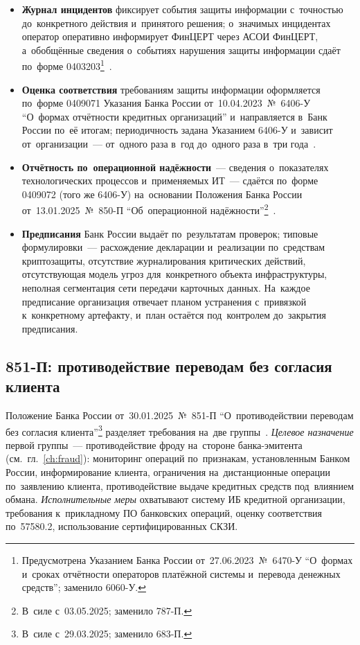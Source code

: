 \begin{itemize}
  \item\textbf{Журнал инцидентов} фиксирует события защиты
    информации с~точностью до~конкретного действия и~принятого
    решения; о~значимых инцидентах оператор оперативно информирует
    ФинЦЕРТ через АСОИ ФинЦЕРТ, а~обобщённые сведения о~событиях
    нарушения защиты информации сдаёт по~форме
    0403203\footnote{Предусмотрена Указанием Банка России от~27.06.2023~№~6470-У
      \enquote{О~формах и~сроках отчётности операторов платёжной системы
    и~перевода денежных средств}; заменило 6060-У.}~\cite{cbr-6470u}.
  \item\textbf{Оценка соответствия} требованиям защиты
    информации оформляется по~форме 0409071 Указания Банка России
    от~10.04.2023~№~6406-У \enquote{О~формах отчётности кредитных
    организаций} и~направляется в~Банк России по~её итогам;
    периодичность задана Указанием 6406-У и~зависит
    от~организации~--- от~одного раза в~год до~одного раза в~три
    года~\cite{cbr-6406u}.
  \item\textbf{Отчётность по~операционной надёжности}~--- сведения
    о~показателях технологических процессов и~применяемых ИТ~---
    сдаётся по~форме 0409072 (того же 6406-У) на~основании Положения
    Банка России от~13.01.2025~№~850-П \enquote{Об~операционной
    надёжности}\footnote{В~силе с~03.05.2025; заменило 787-П.}~\cite{cbr-850p}.
  \item\textbf{Предписания} Банк России выдаёт по~результатам проверок;
    типовые формулировки~--- расхождение декларации и~реализации
    по~средствам криптозащиты, отсутствие журналирования критических
    действий, отсутствующая модель угроз для~конкретного объекта
    инфраструктуры, неполная сегментация сети передачи карточных
    данных. На~каждое предписание организация отвечает планом
    устранения с~привязкой к~конкретному артефакту, и~план
    остаётся под~контролем до~закрытия предписания.
\end{itemize}

\subsection*{851-П: противодействие переводам без согласия клиента}

Положение Банка России от~30.01.2025~№~851-П \enquote{О~противодействии
переводам без согласия клиента}\footnote{В~силе с~29.03.2025; заменило 683-П.}
разделяет требования на~две группы~\cite{cbr-851p}. \emph{Целевое назначение}
первой группы~--- противодействие фроду на~стороне банка-эмитента
(см.~гл.~\ref{ch:fraud}): мониторинг операций по~признакам, установленным
Банком России, информирование клиента, ограничения на~дистанционные операции
по~заявлению клиента, противодействие выдаче кредитных средств под~влиянием
обмана. \emph{Исполнительные меры} охватывают систему ИБ кредитной организации,
требования к~прикладному ПО банковских операций, оценку соответствия
по~57580.2, использование сертифицированных СКЗИ.

